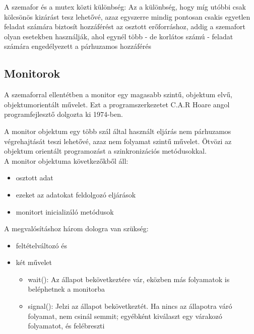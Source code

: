 \documentclass[tikz,12pt,margin=0px]{article}
\begin{document}
    \noindent A szemafor és a mutex közti különbség: Az a különbség, hogy míg utóbbi csak kölcsönös kizárást tesz lehetővé, azaz egyszerre mindig pontosan csakis egyetlen feladat számára biztosít hozzáférést az osztott erőforráshoz, addig a szemafort olyan esetekben használják, ahol egynél több - de korlátos számú - feladat számára engedélyezett a párhuzamos hozzáférés

    \subsection*{Monitorok}

    A szemaforral ellentétben a monitor egy magasabb szintű, objektum elvű, objektumorientált művelet. Ezt a programszerkezetet C.A.R Hoare angol programfejlesztő  dolgozta ki 1974-ben. \

    \noindent A monitor objektum egy több szál által használt eljárás nem párhuzamos végrehajtását teszi lehetővé, azaz nem folyamat szintű művelet. Ötvözi az objektum orientált programozást a szinkronizációs metódusokkal.\\

    \noindent A monitor objektuma következőkből áll:

    \begin{itemize}[topsep=8pt,itemsep=4pt,partopsep=4pt, parsep=4pt]
        \item osztott adat
        \item ezeket az adatokat feldolgozó eljárások
        \item monitort inicializáló metódusok
    \end{itemize}

    \noindent A megvalósításhoz három dologra van szükség:

    \begin{itemize}[topsep=8pt,itemsep=4pt,partopsep=4pt, parsep=4pt]
        \item feltételváltozó és
        \item két művelet
        \begin{itemize}
            \item wait(): Az állapot bekövetkeztére vár, eközben más folyamatok is beléphetnek a monitorba
            \item signal(): Jelzi az állapot bekövetkeztét. Ha nincs az állapotra váró folyamat, nem csinál semmit; egyébként kiválaszt egy várakozó folyamatot, és felébreszti
        \end{itemize}
    \end{itemize}
\end{document}
